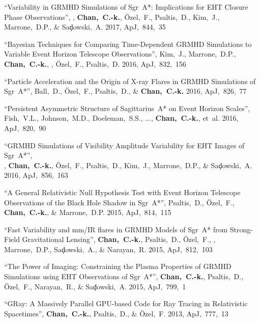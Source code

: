 \begin{ilist}
\item ``Variability in GRMHD Simulations of Sgr~A*: Implications for EHT Closure Phase Observations'',
  , \textbf{Chan,~C.-k.}, {\"O}zel,~F., Psaltis,~D., Kim,~J., Marrone,~D.P., \& Sa{\c d}owski,~A.
  2017, ApJ,~844,~35

\item ``Bayesian Techniques for Comparing Time-Dependent GRMHD Simulations to Variable Event Horizon Telescope Observations'',
  Kim,~J., Marrone,~D.P., \textbf{Chan,~C.-k.}, , {\"O}zel,~F., Psaltis,~D.
  2016, ApJ,~832,~156

\item ``Particle Acceleration and the Origin of X-ray Flares in GRMHD Simulations of Sgr~A*'',
  Ball,~D., {\"O}zel,~F., Psaltis,~D., \& \textbf{Chan,~C.-k.}
  2016, ApJ,~826,~77

\item ``Persistent Asymmetric Structure of Sagittarius~A* on Event Horizon Scales'',
  Fish,~V.L., Johnson,~M.D., Doeleman,~S.S., ..., \textbf{Chan,~C.-k.}, et~al.
  2016, ApJ,~820,~90

\item ``GRMHD Simulations of Visibility Amplitude Variability for EHT Images of Sgr~A*'',\\
  , \textbf{Chan,~C.-k.}, {\"O}zel,~F., Psaltis,~D., Kim,~J., Marrone,~D.P., \& Sa{\c d}owski,~A.
  2016, ApJ,~856,~163

\item ``A General Relativistic Null Hypothesis Test with Event Horizon Telescope Observations of the Black Hole Shadow in Sgr~A*'',
  Psaltis,~D., {\"O}zel,~F., \textbf{Chan,~C.-k.}, \& Marrone,~D.P.
  2015, ApJ,~814,~115

\item ``Fast Variability and mm/IR flares in GRMHD Models of Sgr~A* from Strong-Field Gravitational Lensing'',
  \textbf{Chan,~C.-k.}, Psaltis,~D., {\"O}zel,~F., , Marrone,~D.P., Sa{\c d}owski,~A., \& Narayan,~R.
  2015, ApJ,~812,~103

\item ``The Power of Imaging: Constraining the Plasma Properties of GRMHD Simulations using EHT Observations of Sgr~A*'',
  \textbf{Chan,~C.-k.}, Psaltis,~D., {\"O}zel,~F., Narayan,~R., \& Sa{\c d}owski,~A.
  2015, ApJ,~799,~1

\item ``GRay: A Massively Parallel GPU-based Code for Ray Tracing in Relativistic Spacetimes'',
  \textbf{Chan,~C.-k.}, Psaltis,~D., \& {\"O}zel,~F.
  2013, ApJ,~777,~13


\end{ilist}
